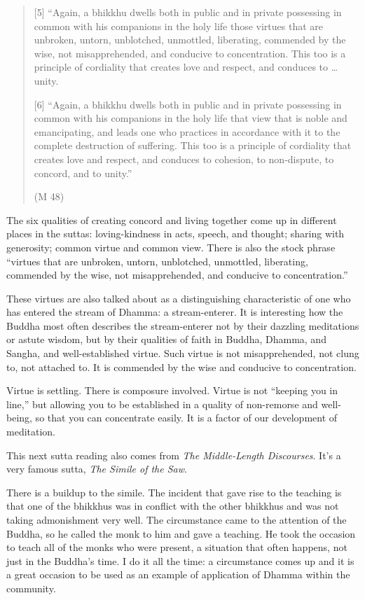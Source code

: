 \begin{quotation}
{[}5{]} “Again, a bhikkhu dwells both in public and in private
possessing in common with his companions in the holy life those virtues
that are unbroken, untorn, unblotched, unmottled, liberating, commended
by the wise, not misapprehended, and conducive to concentration. This
too is a principle of cordiality that creates love and respect, and
conduces to \ldots{} unity.

{[}6{]} “Again, a bhikkhu dwells both in public and in private
possessing in common with his companions in the holy life that view that
is noble and emancipating, and leads one who practices in accordance
with it to the complete destruction of suffering. This too is a
principle of cordiality that creates love and respect, and conduces to
cohesion, to non-dispute, to concord, and to unity.”

(M 48)
\end{quotation}

The six qualities of creating concord and living together come up in
different places in the suttas: loving-kindness in acts, speech, and
thought; sharing with generosity; common virtue and common view. There
is also the stock phrase “virtues that are unbroken, untorn, unblotched,
unmottled, liberating, commended by the wise, not misapprehended, and
conducive to concentration.”

These virtues are also talked about as a distinguishing characteristic
of one who has entered the stream of Dhamma: a stream-enterer. It is
interesting how the Buddha most often describes the stream-enterer not
by their dazzling meditations or astute wisdom, but by their qualities
of faith in Buddha, Dhamma, and Sangha, and well-established virtue.
Such virtue is not misapprehended, not clung to, not attached to. It is
commended by the wise and conducive to concentration.

Virtue is settling. There is composure involved. Virtue is not “keeping
you in line,” but allowing you to be established in a quality of
non-remorse and well-being, so that you can concentrate easily. It is a
factor of our development of meditation.

This next sutta reading also comes from \emph{The Middle-Length
Discourses}. It’s a very famous sutta, \emph{The Simile of the Saw}.

There is a buildup to the simile. The incident that gave rise to the
teaching is that one of the bhikkhus was in conflict with the other
bhikkhus and was not taking admonishment very well. The circumstance
came to the attention of the Buddha, so he called the monk to him and
gave a teaching. He took the occasion to teach all of the monks who were
present, a situation that often happens, not just in the Buddha’s time.
I do it all the time: a circumstance comes up and it is a great occasion
to be used as an example of application of Dhamma within the community.


